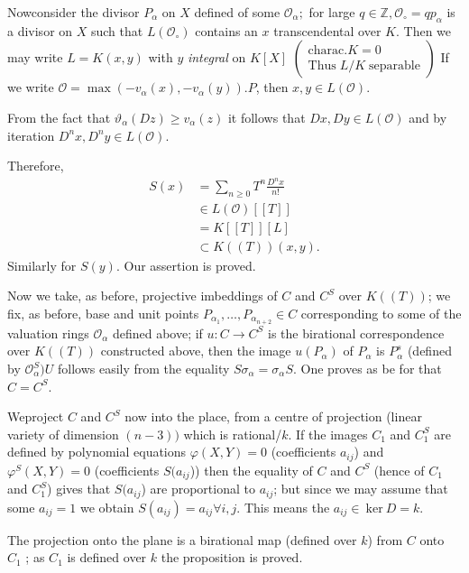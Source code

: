 Now\pageoriginale consider the divisor $P_\alpha $ on $X$ defined of some
$\mathscr{O}_\alpha ;$ for large $q \in \mathbb{Z},
\mathcal{O}_\circ=q p_\alpha$ is a divisor on $X$ such that
$L(\mathcal{O}_\circ)$ contains an $x$ transcendental over $K$. Then
we may write $L=K(x,y)$ with $y$ \textit {integral} on $K[X]$
$\begin{pmatrix}{\text {charac}.K=0}\\{\text{Thus}\; L/K
    \;\text{separable}}\end{pmatrix}$ If we write
$\mathcal{O}=\max(-v_\alpha (x),-v_\alpha (y)).P$, then $x,y\in L
(\mathcal{O})$. 
 
From the fact that $\vartheta_\alpha  (Dz)\geq v_\alpha  (z)$ it
follows that $Dx, Dy  \in L(\mathcal{O})$  and by iteration $D^nx, D^n
y \in L (\mathcal{O})$. 

Therefore,
\begin{align*}
   S(x) &= \sum_{n\geq 0} T^n
  \frac{D^n x}{n!}\\ 
  & \in L(\mathcal{O}) [[T]]\\ 
  &  =K[[T]][L] \\    
  &  \subset K((T))(x,y).  
 \end{align*}  
Similarly for $S(y)$. Our assertion is proved.
   
Now we take, as before, projective imbeddings of $C$ and $C^S$  over
$K((T))$; we fix, as before, base and unit points $P_{\alpha_
  1},\ldots,  P_{\alpha _{n+2}} \in C$ corresponding to some of the
valuation rings $\mathcal{O}_\alpha $ defined above; if $u:C
\rightarrow C^S$ is the birational correspondence over $K((T))$
constructed above, then the image $u(P_\alpha)$ of $P_\alpha $ is
$P^s_\alpha $ (defined by $\mathcal{O}^S_\alpha ) U$ follows easily
from the equality  $S\sigma_\alpha  =\sigma_\alpha  S$. One proves as
be for that $C=C^S$. 

We\pageoriginale project $C$ and $C^S$ now into the place, from a centre of
projection (linear variety of dimension $(n-3))$ which is
rational/$k$. If the images $C_1$ and $C_1^S$ are defined by
polynomial equations $\varphi (X,Y) = 0$ (coefficients $a_{ij}$) and
$\varphi^S (X,Y) = 0$ (coefficients $S(a_{ij}$)) then the equality of
$C$ and $C^S$ (hence of $C_1$ and $C_1^S$) gives that $S(a_{ij}$) are
proportional to $a_{ij}$; but since we may assume that some $a_{ij} =
1$ we obtain $S(a_{ij}) = a_{ij} \forall i,j$. This means the ${a_{ij}
  \in  ~\text{ker}~ D = k}$.  

The projection onto the plane is a birational map (defined over $k$)
from $C$ onto $C_1$ ; as $C_1$ is defined over $k$ the proposition is
proved.


